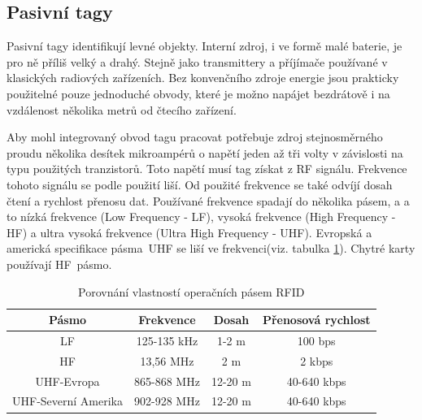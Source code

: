 \subsection{Pasivní tagy}
Pasivní tagy identifikují levné objekty. Interní zdroj, i ve formě malé baterie, je pro ně příliš velký a drahý. Stejně jako transmittery a příjímače používané v klasických radiových zařízeních. Bez konvenčního zdroje energie jsou prakticky použitelné pouze jednoduché obvody, které je možno napájet bezdrátově i na vzdálenost několika metrů od čtecího zařízení. 
\par 
Aby mohl integrovaný obvod tagu pracovat potřebuje zdroj stejnosměrného proudu několika desítek mikroampérů o napětí  jeden až tři volty v závislosti na typu použitých tranzistorů. Toto napětí musí tag získat z RF signálu\cite{The_RF_in_RFID}. Frekvence tohoto signálu se podle použití liší. Od použité frekvence se také odvíjí dosah čtení a rychlost přenosu dat. Používané frekvence spadají do několika pásem, a a to nízká frekvence ({Low Frequency - LF}), vysoká frekvence ({High Frequency - HF}) a ultra vysoká frekvence ({Ultra High Frequency - UHF}). Evropská a americká specifikace pásma~UHF se liší ve frekvenci(viz. tabulka \ref{tabulka_pasem}). Chytré karty používají HF~pásmo\cite{Smart_Cards_Tokens_Security}. 

\begin{table}[]
\begin{tabular}{cccc}
\hline
Pásmo               & Frekvence   & Dosah   & Přenosová rychlost \\ \hline
LF                  & 125-135 kHz & 1-2 m   & 100 bps            \\
HF                  & 13,56 MHz   & 2 m     & 2 kbps             \\
UHF-Evropa          & 865-868 MHz & 12-20 m & 40-640 kbps        \\
UHF-Severní Amerika & 902-928 MHz & 12-20 m & 40-640 kbps        \\ \hline
\end{tabular}
\caption{Porovnání vlastností operačních pásem RFID\cite{RFID_explained}\cite{The_RF_in_RFID}}
\label{tabulka_pasem}
\end{table}

